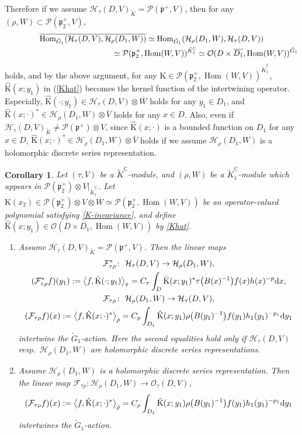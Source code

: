 \documentclass[pdftex]{sigma}
\numberwithin{equation}{section}
\newtheorem{Corollary}[Theorem]{Corollary}
\newcommand{\BC}{\mathbb{C}}
\newcommand{\fp}{\mathfrak{p}}
\newcommand{\cF}{\mathcal{F}}
\newcommand{\cH}{\mathcal{H}}
\newcommand{\cO}{\mathcal{O}}
\newcommand{\cP}{\mathcal{P}}
\newcommand{\rK}{\mathrm{K}}
\newcommand{\Hom}{\operatorname{Hom}}
\begin{document}
Therefore if we assume $\cH_\tau(D,V)_{\tilde{K}}=\cP(\fp^+,V)$, then for any $(\rho,W)\subset \cP(\fp^+_2,V)$,
\begin{gather*}
 \overline{\Hom_{\tilde{G}_1}(\cH_\tau(D,V),\cH_\rho(D_1,W))}\simeq \Hom_{\tilde{G}_1}(\cH_\rho(D_1,W),\cH_\tau(D,V)) \\
\hphantom{\overline{\Hom_{\tilde{G}_1}(\cH_\tau(D,V),\cH_\rho(D_1,W))}}{} \simeq \cP(\fp^+_2,\Hom(W,V))^{\tilde{K}^\BC_1}\simeq \cO(D\times \overline{D_1}, \Hom(W,V))^{\tilde{G}_1}
\end{gather*}
holds, and by the above argument,
for any $\rK\in\cP(\fp^+_2,\Hom(W,V))^{\tilde{K}^\BC_1}$, $\hat{\rK}(x;y_1)$ in (\ref{Khat}) becomes
the kernel function of the intertwining operator.
Especially, $\hat{\rK}(\cdot;y_1)\in\cH_\tau(D,V)\otimes \overline{W}$ holds for any $y_1\in D_1$,
and $\hat{\rK}(x;\cdot)^*\in\cH_{\rho}(D_1,W)\otimes \overline{V}$ holds for any $x\in D$.
Also, even if $\cH_\tau(D,V)_{\tilde{K}}\ne\cP(\fp^+)\otimes V$, since $\hat{\rK}(x;\cdot)$ is a bounded function on $D_1$ for any $x\in D$,
$\hat{\rK}(x;\cdot)^*\in\cH_{\rho}(D_1,W)\otimes \overline{V}$ holds
if we assume $\cH_\rho(D_1,W)$ is a holomorphic discrete series representation.
\begin{Corollary}\label{integral_expression}
Let $(\tau,V)$ be a $\tilde{K}^\BC$-module, and $(\rho,W)$ be a $\tilde{K}_1^\BC$-module
which appears in $\cP(\fp^+_2)\otimes V|_{\tilde{K}_1^\BC}$.
Let $\rK(x_2)\in \cP(\fp^+_2)\otimes V\otimes\overline{W}\simeq\cP(\fp^+_2,\Hom(W,V))$ be an operator-valued polynomial
satisfying \eqref{K-invariance}, and define $\hat{\rK}(x;y_1)\in\cO(D\times\overline{D_1},\Hom(W,V))$ by \eqref{Khat}.
\begin{enumerate}\itemsep=0pt
\item[$(1)$] Assume $\cH_\tau(D,V)_{\tilde{K}}=\cP(\fp^+,V)$. Then the linear maps
\begin{gather*}
\cF_{\tau\rho}^*\colon \ \cH_\tau(D,V)\to\cH_\rho(D_1,W), \\
(\cF_{\tau\rho}^*f)(y_1):=\big\langle f,\hat{\rK}(\cdot;y_1)\big\rangle_{\hat{\tau}}
=C_\tau\int_D\hat{\rK}(x;y_1)^*\tau\big(B(x)^{-1}\big)f(x)h(x)^{-p}{\rm d}x, \\
\cF_{\tau\rho}\colon \ \cH_\rho(D_1,W)\to \cH_\tau(D,V), \\
(\cF_{\tau\rho}f)(x):=\big\langle f,\hat{\rK}(x;\cdot)^*\big\rangle_{\hat{\rho}}
=C_\rho\int_{D_1}\hat{\rK}(x;y_1)\rho\big(B(y_1)^{-1}\big)f(y_1)h_1(y_1)^{-p_1}{\rm d}y_1
\end{gather*}
intertwine the $\tilde{G}_1$-action. Here the second equalities hold only if $\cH_\tau(D{,}V)$ resp.~$\cH_\rho(D_1{,}W)$ are holomorphic discrete series representations.
\item[$(2)$] Assume $\cH_\rho(D_1,W)$ is a holomorphic discrete series representation.
Then the linear map $\cF_{\tau\rho}\colon \cH_\rho(D_1,W)\to \cO_\tau(D,V)$,
\begin{gather*} (\cF_{\tau\rho}f)(x):=\big\langle f,\hat{\rK}(x;\cdot)^*\big\rangle_{\hat{\rho}}
=C_\rho\int_{D_1}\hat{\rK}(x;y_1)\rho\big(B(y_1)^{-1}\big)f(y_1)h_1(y_1)^{-p_1}{\rm d}y_1 \end{gather*}
intertwines the $\tilde{G}_1$-action.
\end{enumerate}
\end{Corollary}
\end{document}
